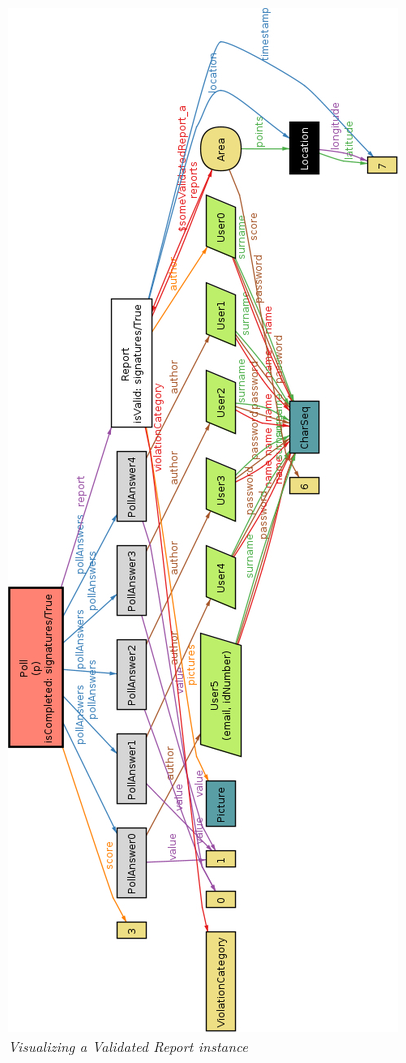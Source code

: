 \begin{figure}[H]
  \centering
  \includegraphics[origin=c,width=\textwidth,height=.95\textheight,keepaspectratio]{RASD_Images/AlloyWorlds/someValidatedReports.jpg}
  \caption{\textit{Visualizing a Validated Report instance}}
\end{figure}

